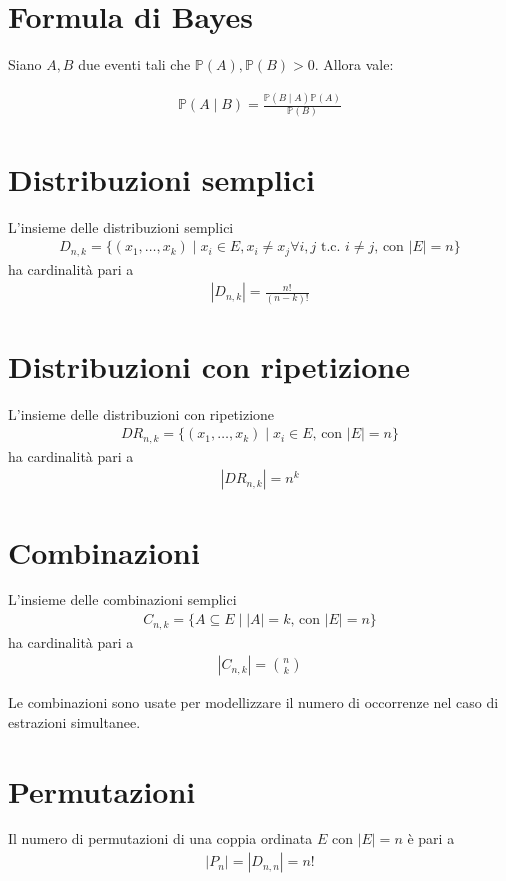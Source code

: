 \documentclass{article}
\begin{document}
\section{Formula di Bayes}

Siano $A,B$ due eventi tali che $\mathbb{P}(A), \mathbb{P}(B) > 0$. Allora vale:

\begin{align*}
\mathbb{P}(A \mid B) = \frac{\mathbb{P}(B \mid A)\mathbb{P}(A)}{\mathbb{P}(B)}
\end{align*}

\section{Distribuzioni semplici}
L'insieme delle distribuzioni semplici
\begin{align*}
    D_{n,k} = \{(x_1, \ldots, x_k) \mid x_i \in E, x_i \neq x_j \forall i,j \text{ t.c. } i \neq j\text{, con } |E|=n \}
\end{align*}
ha cardinalit\`a pari a
\begin{align*}
|D_{n,k}| = \frac{n!}{(n-k)!}
\end{align*}

\section{Distribuzioni con ripetizione}
L'insieme delle distribuzioni con ripetizione
\begin{align*}
    DR_{n,k} = \{(x_1, \ldots, x_k) \mid x_i \in E\text{, con } |E|=n \}
\end{align*}
ha cardinalit\`a pari a
\begin{align*}
|DR_{n,k}| = n^k
\end{align*}

\section{Combinazioni}
L'insieme delle combinazioni semplici
\begin{align*}
    C_{n,k} = \{A \subseteq E \mid |A| = k\text{, con } |E|=n \}
\end{align*}
ha cardinalit\`a pari a
\begin{align*}
|C_{n,k}| = {n \choose k}
\end{align*}

Le combinazioni sono usate per modellizzare il numero di occorrenze nel caso di estrazioni simultanee.

\section{Permutazioni}
Il numero di permutazioni di una coppia ordinata $E$ con $|E| = n$ \`e pari a 
\begin{align*}
    |P_n| = |D_{n,n}| = n!
\end{align*}
\end{document}
